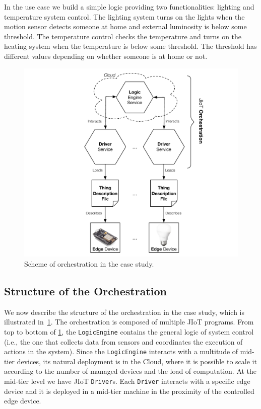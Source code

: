 In the use case we build a simple logic providing two functionalities:
lighting and temperature system control. The lighting system turns on the
lights when the motion sensor detects someone at home and external luminosity
is below some threshold. The temperature control checks the temperature and
turns on the heating system when the temperature is below some threshold. The
threshold has different values depending on whether someone is at home or not.

\begin{figure}[b]
  \centering
  \includegraphics[width=.8\textwidth]{case_study_abstraction.pdf}
  \caption{Scheme of orchestration in the case study.}
  \label{fig:case_study_abstraction}
\end{figure}

\subsection{Structure of the Orchestration}

We now describe the structure of the orchestration in the case study, which is
illustrated in~\cref{fig:case_study_abstraction}.
%
The orchestration is composed of multiple JIoT programs. From top to bottom of
\cref{fig:case_study_abstraction}, the \texttt{LogicEngine} contains the
general logic of system control (i.e., the one that collects data from sensors
and coordinates the execution of actions in the system). Since the
\texttt{LogicEngine} interacts with a multitude of mid-tier devices, its
natural deployment is in the Cloud, where it is possible to scale it according
to the number of managed devices and the load of computation. At the mid-tier
level we have JIoT \texttt{Driver}s. Each \texttt{Driver} interacts with a
specific edge device and it is deployed in a mid-tier machine in the proximity
of the controlled edge device.

